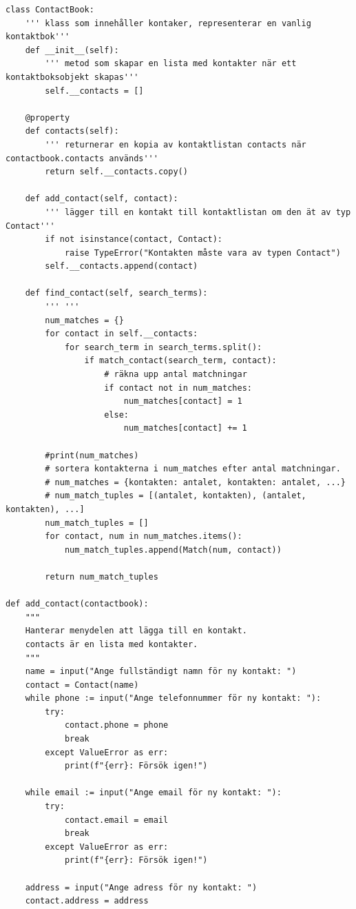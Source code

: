\documentclass{article}
\begin{document}
\begin{verbatim}
class ContactBook:
    ''' klass som innehåller kontaker, representerar en vanlig kontaktbok'''
    def __init__(self):
        ''' metod som skapar en lista med kontakter när ett kontaktboksobjekt skapas'''
        self.__contacts = []

    @property
    def contacts(self):
        ''' returnerar en kopia av kontaktlistan contacts när contactbook.contacts används'''
        return self.__contacts.copy()

    def add_contact(self, contact):
        ''' lägger till en kontakt till kontaktlistan om den ät av typ Contact'''
        if not isinstance(contact, Contact):
            raise TypeError("Kontakten måste vara av typen Contact")
        self.__contacts.append(contact)

    def find_contact(self, search_terms):
        ''' '''
        num_matches = {}
        for contact in self.__contacts:
            for search_term in search_terms.split():
                if match_contact(search_term, contact):
                    # räkna upp antal matchningar
                    if contact not in num_matches:
                        num_matches[contact] = 1
                    else:
                        num_matches[contact] += 1

        #print(num_matches)
        # sortera kontakterna i num_matches efter antal matchningar.
        # num_matches = {kontakten: antalet, kontakten: antalet, ...}
        # num_match_tuples = [(antalet, kontakten), (antalet, kontakten), ...]
        num_match_tuples = []
        for contact, num in num_matches.items():
            num_match_tuples.append(Match(num, contact))

        return num_match_tuples

def add_contact(contactbook):
    """
    Hanterar menydelen att lägga till en kontakt.
    contacts är en lista med kontakter.
    """
    name = input("Ange fullständigt namn för ny kontakt: ")
    contact = Contact(name)
    while phone := input("Ange telefonnummer för ny kontakt: "):
        try:
            contact.phone = phone
            break
        except ValueError as err:
            print(f"{err}: Försök igen!")

    while email := input("Ange email för ny kontakt: "):
        try:
            contact.email = email
            break
        except ValueError as err:
            print(f"{err}: Försök igen!")

    address = input("Ange adress för ny kontakt: ")
    contact.address = address


\end{verbatim}
\end{document}
